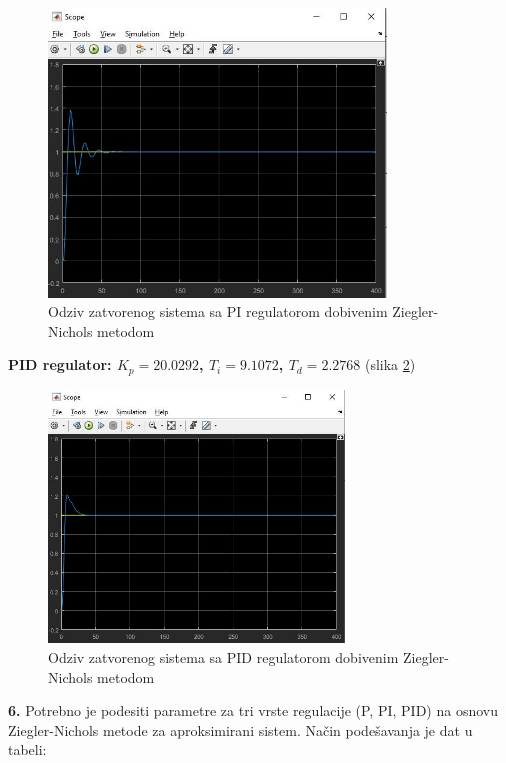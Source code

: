 \begin{figure} [H]
  \centering
  \includegraphics[width=0.8\textwidth]{z1_14}
  \caption{Odziv zatvorenog sistema sa PI regulatorom dobivenim Ziegler-Nichols metodom}
  \label{fig:z1_14}
\end{figure} 

\textbf{PID regulator: $K_p=20.0292$, $T_i=9.1072$, $T_d=2.2768$} (slika \ref{fig:z1_15})

\begin{figure} [H]
  \centering
  \includegraphics[width=0.7\textwidth]{z1_15}
  \caption{Odziv zatvorenog sistema sa PID regulatorom dobivenim Ziegler-Nichols metodom}
  \label{fig:z1_15}
\end{figure} 

\textbf{6.} 	Potrebno je podesiti parametre za tri vrste regulacije (P, PI, PID) na osnovu Ziegler-Nichols metode za aproksimirani sistem. Način podešavanja je dat u tabeli:
 
